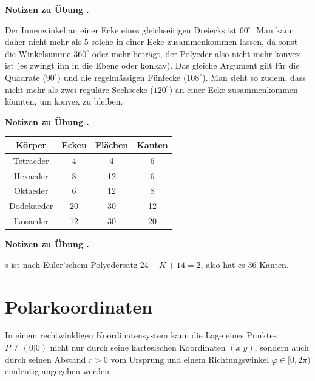 \documentclass[%
11pt,%
twoside,%
titlepage,%
swissgerman,%
headsepline%
]{scrartcl}
\newcommand{\faReturnGray}{\textcolor{gray}{\faMailReply}} %
\newcommand{\spaltenheight}{\rule{0mm}{3ex}}
\newcommand{\spaltensep}{\\[1ex]}
\theoremstyle{definition}
\theoremstyle{plain}
\newcommand{\concatueb}[1]{ueb:#1}%
\newcommand{\concatlsg}[1]{lsg:#1}%
\newcounter{uebcounter}[section]
\renewcommand{\theuebcounter}{\thesection.\arabic{uebcounter}}  %
\newenvironment{lsg}[1]{%
    \par\noindent\textbf{Notizen zu Übung \theuebcounter\label{\concatlsg{#1}}}
    \hfill\hyperref[\concatueb{#1}]{\faReturnGray}\par %
}{%
    \par%
}
\begin{document}
\begin{lsg}{anzahlpolyeder}
Der Innenwinkel an einer Ecke eines gleichseitigen Dreiecks ist $60^\circ$. Man kann daher nicht mehr als $5$ solche in einer Ecke zusammenkommen lassen, da sonst die Winkelsumme $360^\circ$ oder mehr beträgt, der Polyeder also nicht mehr konvex ist (es zwingt ihn in die Ebene oder konkav). Das gleiche Argument gilt für die Quadrate ($90^\circ$) und die regelmässigen Fünfecke ($108^\circ$). Man sieht so zudem, dass nicht mehr als zwei reguläre Sechsecke ($120^\circ$) an einer Ecke zusammenkommen könnten, um konvex zu bleiben.
\end{lsg}
\begin{lsg}{eminuskplusfgleichzwei}
    \begin{center}
\begin{tabular}{|c|c|c|c|}\hline
\spaltenheight\textbf{K\"orper} & \textbf{Ecken} & \textbf{Fl\"achen} & \textbf{Kanten}\spaltensep \hline
\spaltenheight Tetraeder & 4 & 4 & 6\spaltensep \hline
\spaltenheight Hexaeder & 8 & 12 & 6\spaltensep \hline
\spaltenheight Oktaeder & 6 & 12 & 8\spaltensep \hline
\spaltenheight Dodekaeder & 20 & 30 & 12\spaltensep \hline
\spaltenheight Ikosaeder & 12 & 30 & 20\spaltensep \hline
\end{tabular}
\end{center}
\end{lsg}
\begin{lsg}
Es ist nach Euler'schem Polyedersatz $24-K+14=2$, also hat es $36$ Kanten.
\end{lsg}

\clearpage

\section{Polarkoordinaten}

In einem rechtwinkligen Koordinatensystem kann die Lage eines Punktes $P\neq(0|0)$ nicht nur durch seine kartesischen Koordinaten $(x|y)$, sondern auch durch seinen Abstand $r>0$ vom Ursprung und einem Richtungswinkel $\varphi\in[0,2\pi)$ eindeutig angegeben werden.

\begin{center}
\end{center}
\end{document}
